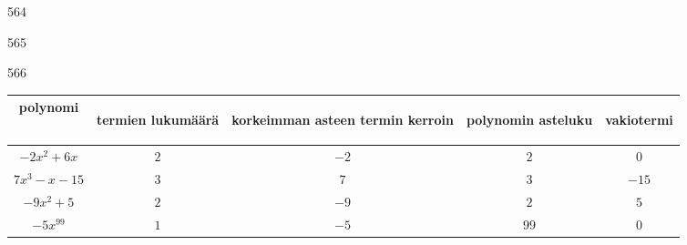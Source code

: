 \begin{Vastaus}{564}
    
\end{Vastaus}
\begin{Vastaus}{565}
	
\end{Vastaus}
\begin{Vastaus}{566}
    \begin{footnotesize}
	    \begin{tabular}{|c|c|c|c|c|}
	     \hline
polynomi     & \begin{sideways}termien lukumäärä\end{sideways}%
& \begin{sideways}korkeimman asteen termin kerroin\end{sideways}%
& \begin{sideways}polynomin asteluku\end{sideways}%
& \begin{sideways}vakiotermi\end{sideways} \\ \hline
$-2x^2+6x$   &        $2$          &         $-2$      &       $2$             &    $0$       \\ \hline
$7x^3-x-15$  &        $3$          &           $7$       &       $3$             &    $-15$   \\ \hline
$-9x^2+5$    &        $2$          &          $-9$     &       $2$             &    $5$       \\ \hline
$-5x^{99}$   &        $1$          &          $-5$     &       $99$            &         $0$      \\ \hline
   	  \end{tabular}
      \end{footnotesize}
     
\end{Vastaus}

